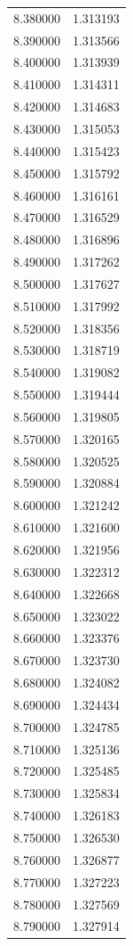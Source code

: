 \begin{tabular}{rr}
8.380000 & 1.313193 \\
8.390000 & 1.313566 \\
8.400000 & 1.313939 \\
8.410000 & 1.314311 \\
8.420000 & 1.314683 \\
8.430000 & 1.315053 \\
8.440000 & 1.315423 \\
8.450000 & 1.315792 \\
8.460000 & 1.316161 \\
8.470000 & 1.316529 \\
8.480000 & 1.316896 \\
8.490000 & 1.317262 \\
8.500000 & 1.317627 \\
8.510000 & 1.317992 \\
8.520000 & 1.318356 \\
8.530000 & 1.318719 \\
8.540000 & 1.319082 \\
8.550000 & 1.319444 \\
8.560000 & 1.319805 \\
8.570000 & 1.320165 \\
8.580000 & 1.320525 \\
8.590000 & 1.320884 \\
8.600000 & 1.321242 \\
8.610000 & 1.321600 \\
8.620000 & 1.321956 \\
8.630000 & 1.322312 \\
8.640000 & 1.322668 \\
8.650000 & 1.323022 \\
8.660000 & 1.323376 \\
8.670000 & 1.323730 \\
8.680000 & 1.324082 \\
8.690000 & 1.324434 \\
8.700000 & 1.324785 \\
8.710000 & 1.325136 \\
8.720000 & 1.325485 \\
8.730000 & 1.325834 \\
8.740000 & 1.326183 \\
8.750000 & 1.326530 \\
8.760000 & 1.326877 \\
8.770000 & 1.327223 \\
8.780000 & 1.327569 \\
8.790000 & 1.327914 \\

\end{tabular}

